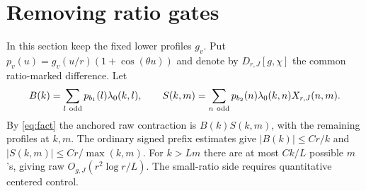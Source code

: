 \section{Removing ratio gates}\label{sec:ratio-tail}

In this section keep the fixed lower profiles \(g_v\). Put
\(p_v(u)=g_v(u/r)(1+\cos(\theta u))\)
and denote by \(D_{r,J}[g,\chi]\) the common ratio-marked difference. Let
\[
 B(k)=\sum_{l\ {\rm odd}}p_{b_1}(l)\lambda_0(k,l),\qquad
 S(k,m)=\sum_{n\ {\rm odd}}p_{b_2}(n)\lambda_0(k,n)X_{r,J}(n,m).
\]
By \eqref{eq:fact} the anchored raw contraction is \(B(k)S(k,m)\), with the remaining profiles at \(k,m\). The ordinary signed prefix estimates give \(|B(k)|\le Cr/k\) and \(|S(k,m)|\le Cr/\max(k,m)\). For \(k>Lm\) there are at most \(Ck/L\) possible \(m\)'s, giving raw \(O_{g,J}(r^2\log r/L)\). The small-ratio side requires quantitative centered control.

